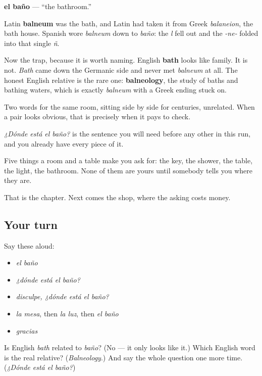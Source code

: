 \begin{cousinweb}
\textbf{el baño} — \textquotedblleft{}the bathroom.\textquotedblright{}

Latin \textbf{balneum} was the bath, and Latin had taken it from Greek \emph{balaneion}, the bath house. Spanish wore \emph{balneum} down to \emph{baño}: the \emph{l} fell out and the \emph{-ne-} folded into that single \emph{ñ}.

Now the trap, because it is worth naming. English \textbf{bath} looks like family. It is not. \emph{Bath} came down the Germanic side and never met \emph{balneum} at all. The honest English relative is the rare one: \textbf{balneology}, the study of baths and bathing waters, which is exactly \emph{balneum} with a Greek ending stuck on.

Two words for the same room, sitting side by side for centuries, unrelated. When a pair looks obvious, that is precisely when it pays to check.

\emph{¿Dónde está el baño?} is the sentence you will need before any other in this run, and you already have every piece of it.
\end{cousinweb}

\begin{grammarlens}[title={What you've built}]
Five things a room and a table make you ask for: the key, the shower, the table, the light, the bathroom. None of them are yours until somebody tells you where they are.

That is the chapter. Next comes the shop, where the asking costs money.
\end{grammarlens}

\subsection*{Your turn}
Say these aloud:

\begin{itemize}
\raggedright
  \item \emph{el baño}
  \item \emph{¿dónde está el baño?}
  \item \emph{disculpe, ¿dónde está el baño?}
  \item \emph{la mesa}, then \emph{la luz}, then \emph{el baño}
  \item \emph{gracias}
\end{itemize}

\begin{tcolorbox}[breakable,colback=teal!4,colframe=teal!35!black,title={Before you move on}]
Is English \emph{bath} related to \emph{baño}? (No — it only looks like it.) Which English word is the real relative? (\emph{Balneology}.) And say the whole question one more time. (\emph{¿Dónde está el baño?})
\end{tcolorbox}
